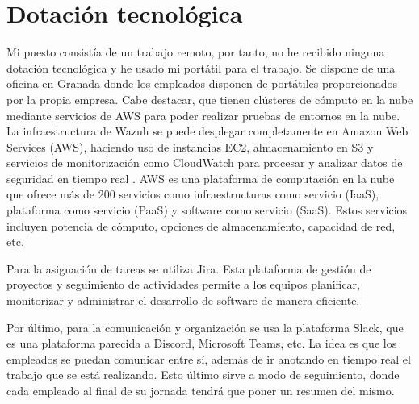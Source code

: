 \section{Dotación tecnológica}
Mi puesto consistía de un trabajo remoto, por tanto, no he recibido ninguna dotación tecnológica y he usado mi portátil para el trabajo. Se dispone de una oficina en Granada donde los empleados disponen de portátiles proporcionados por la propia empresa. Cabe destacar, que tienen clústeres de cómputo en la nube mediante servicios de AWS para poder realizar pruebas de entornos en la nube. La infraestructura de Wazuh se puede desplegar completamente en Amazon Web Services (AWS), haciendo uso de instancias EC2, almacenamiento en S3 y servicios de monitorización como CloudWatch para procesar y analizar datos de seguridad en tiempo real \cite{wazuh_agent_installation}. AWS es una plataforma de computación en la nube que ofrece más de 200 servicios como infraestructuras como servicio (IaaS), plataforma como servicio (PaaS) y software como servicio (SaaS). Estos servicios incluyen potencia de cómputo, opciones de almacenamiento, capacidad de red, etc.

Para la asignación de tareas se utiliza Jira. Esta plataforma de gestión de proyectos y seguimiento de actividades permite a los equipos planificar, monitorizar y administrar el desarrollo de software de manera eficiente.

Por último, para la comunicación y organización se usa la plataforma Slack, que es una plataforma parecida a Discord, Microsoft Teams, etc. La idea es que los empleados se puedan comunicar entre sí, además de ir anotando en tiempo real el trabajo que se está realizando. Esto último sirve a modo de seguimiento, donde cada empleado al final de su jornada tendrá que poner un resumen del mismo.